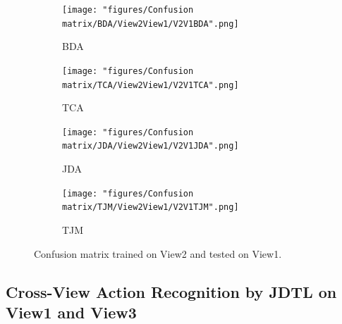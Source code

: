 \begin{figure}[H]
	\begin{subfigure}{.5\textwidth}
		\centering
		\texttt{[image: "figures/Confusion matrix/BDA/View2View1/V2V1BDA".png]}
		\caption{BDA}
		\label{fig:V2V1BDA}
	\end{subfigure}%
	\begin{subfigure}{.5\textwidth}
		\centering
		\texttt{[image: "figures/Confusion matrix/TCA/View2View1/V2V1TCA".png]}
		\caption{TCA}
		\label{fig:V2V1TCA}
	\end{subfigure}
	\begin{subfigure}{.5\textwidth}
		\centering
		\texttt{[image: "figures/Confusion matrix/JDA/View2View1/V2V1JDA".png]}
		\caption{JDA}
		\label{fig:V2V1JDA}
	\end{subfigure}%
	\begin{subfigure}{.5\textwidth}
		\centering
		\texttt{[image: "figures/Confusion matrix/TJM/View2View1/V2V1TJM".png]}
		\caption{TJM}
		\label{fig:V2V1TJM}
	\end{subfigure}
	\caption{Confusion matrix trained on View2 and tested on View1.}
	\label{fig:CMV2V1}
\end{figure}


\subsection{Cross-View Action Recognition by JDTL on View1 and View3}

